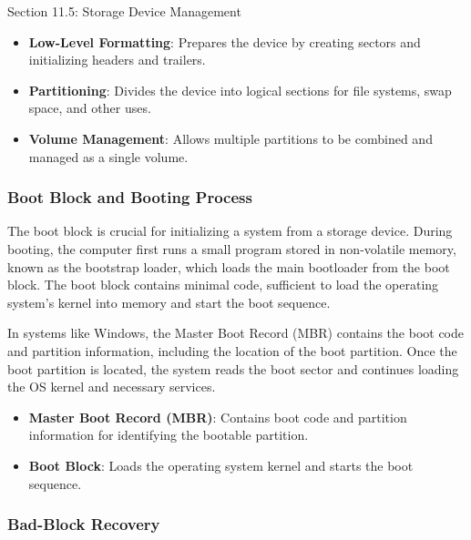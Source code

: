\begin{notes}{Section 11.5: Storage Device Management}
\begin{highlight}
        \begin{itemize}
            \item \textbf{Low-Level Formatting}: Prepares the device by creating sectors and initializing headers and trailers.
            \item \textbf{Partitioning}: Divides the device into logical sections for file systems, swap space, and other uses.
            \item \textbf{Volume Management}: Allows multiple partitions to be combined and managed as a single volume.
        \end{itemize}
    
    \end{highlight}
    
    \subsubsection*{Boot Block and Booting Process}
    
    The boot block is crucial for initializing a system from a storage device. During booting, the computer first runs a small program stored in non-volatile memory, known as the bootstrap loader, which 
    loads the main bootloader from the boot block. The boot block contains minimal code, sufficient to load the operating system's kernel into memory and start the boot sequence.
    
    In systems like Windows, the Master Boot Record (MBR) contains the boot code and partition information, including the location of the boot partition. Once the boot partition is located, the system 
    reads the boot sector and continues loading the OS kernel and necessary services.

    \begin{highlight}
    
        \begin{itemize}
            \item \textbf{Master Boot Record (MBR)}: Contains boot code and partition information for identifying the bootable partition.
            \item \textbf{Boot Block}: Loads the operating system kernel and starts the boot sequence.
        \end{itemize}
    
    \end{highlight}
    
    \subsubsection*{Bad-Block Recovery}
    

\end{notes}

